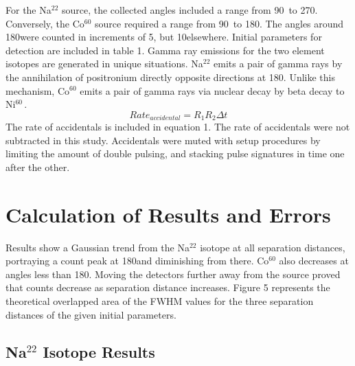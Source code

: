\documentclass[aps,prl,twocolumn,superscriptaddress]{revtex4-1}
\begin{document}

For the Na$^{22}$ source, the collected angles included a range from 90\degree\ to 270\degree. Conversely, the Co$^{60}$ source required a range from 90\degree\ to 180\degree. The angles around 180\degree were counted in increments of 5\degree, but 10\degree elsewhere. Initial parameters for detection are included in table 1. Gamma ray emissions for the two element isotopes are generated in unique situations. Na$^{22}$ emits a pair of gamma rays by the annihilation of positronium directly opposite directions at 180\degree. Unlike this mechanism, Co$^{60}$ emits a pair of gamma rays via nuclear decay by beta decay to Ni$^{60}$\,\cite{3}.
\begin{equation}
Rate_{accidental} = R_1R_2 \Delta t
\end{equation}
The rate of accidentals is included in equation 1. The rate of accidentals were not subtracted in this study. Accidentals were muted with setup procedures by limiting the amount of double pulsing, and stacking pulse signatures in time one after the other.



\section{Calculation of Results and Errors}

Results show a Gaussian trend from the Na$^{22}$ isotope at all separation distances, portraying a count peak at 180\degree and diminishing from there. Co$^{60}$ also decreases at angles less than 180\degree. Moving the detectors further away from the source proved that counts decrease as separation distance increases. Figure 5 represents the theoretical overlapped area of the FWHM values for the three separation distances of the given initial parameters.

\subsection{Na$^{22}$ Isotope Results}
\end{document}
